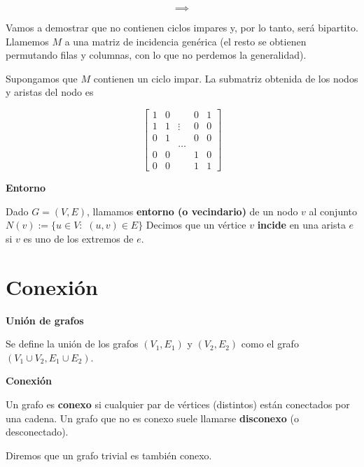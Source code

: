\documentclass[openany]{book}
\begin{document}
\begin{demonstration}
  $$ \implies  $$

  Vamos a demostrar que no contienen ciclos impares y, por lo tanto, será bipartito. Llamemos $M$ a una matriz de incidencia genérica (el resto se obtienen permutando filas y columnas, con lo que no perdemos la generalidad).

  Supongamos que $M$ contienen un ciclo impar. La submatriz obtenida de los nodos y aristas del nodo es

  $$ \left[ \begin{array}{ccccc}
    1 & 0 &  & 0 & 1\\
    1 & 1 & \vdots  & 0 & 0\\
    0 & 1 &  & 0 & 0\\
     &  & \hdots &  & \\
    0 & 0 &  & 1 & 0\\
    0 & 0 &  & 1 & 1
  \end{array} \right] $$
\end{demonstration}


\begin{definition}
  { \color{turquoise} \textbf{Entorno}}

  Dado $G=(V, E)$, llamamos \textbf{entorno (o vecindario)} de un nodo $v$ al conjunto $N(v):=\{u \in V:$ $(u, v) \in E\}$
Decimos que un vértice $v$ \textbf{incide} en una arista $e$ si $v$ es uno de los extremos de $e$.
\end{definition}






\chapter{Conexión}


\begin{definition}
  { \color{turquoise} \textbf{Unión de grafos}}

  Se define la unión de los grafos $\left(V_{1}, E_{1}\right)$ y $\left(V_{2}, E_{2}\right)$ como el grafo $\left(V_{1} \cup V_{2}, E_{1} \cup E_{2}\right)$.
\end{definition}

\begin{definition}{ \color{turquoise} \textbf{Conexión}}


  Un grafo es \textbf{conexo} si cualquier par de vértices (distintos) están conectados por una cadena. Un grafo que no es conexo suele llamarse \textbf{disconexo} (o desconectado).

  Diremos que un grafo trivial es también conexo.

\end{definition}
\end{document}

